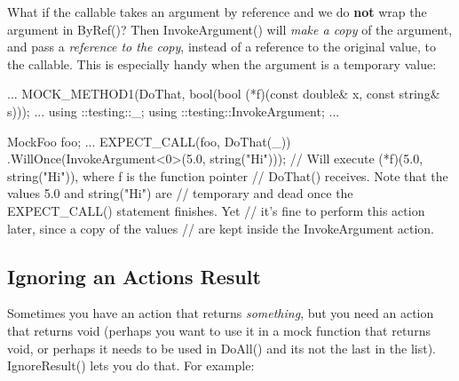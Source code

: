 What if the callable takes an argument by reference and we do {\bfseries not} wrap the argument in {\ttfamily By\+Ref()}? Then {\ttfamily Invoke\+Argument()} will {\itshape make a copy} of the argument, and pass a {\itshape reference to the copy}, instead of a reference to the original value, to the callable. This is especially handy when the argument is a temporary value\+:


\begin{DoxyCode}
...
  MOCK\_METHOD1(DoThat, \textcolor{keywordtype}{bool}(\textcolor{keywordtype}{bool} (*f)(\textcolor{keyword}{const} \textcolor{keywordtype}{double}& x, \textcolor{keyword}{const} \textcolor{keywordtype}{string}& s)));
...
using ::testing::\_;
using ::testing::InvokeArgument;
...

  MockFoo foo;
  ...
  EXPECT\_CALL(foo, DoThat(\_))
      .WillOnce(InvokeArgument<0>(5.0, \textcolor{keywordtype}{string}(\textcolor{stringliteral}{"Hi"})));
  \textcolor{comment}{// Will execute (*f)(5.0, string("Hi")), where f is the function pointer}
  \textcolor{comment}{// DoThat() receives.  Note that the values 5.0 and string("Hi") are}
  \textcolor{comment}{// temporary and dead once the EXPECT\_CALL() statement finishes.  Yet}
  \textcolor{comment}{// it's fine to perform this action later, since a copy of the values}
  \textcolor{comment}{// are kept inside the InvokeArgument action.}
\end{DoxyCode}


\subsection*{Ignoring an Action\textquotesingle{}s Result}

Sometimes you have an action that returns {\itshape something}, but you need an action that returns {\ttfamily void} (perhaps you want to use it in a mock function that returns {\ttfamily void}, or perhaps it needs to be used in {\ttfamily Do\+All()} and it\textquotesingle{}s not the last in the list). {\ttfamily Ignore\+Result()} lets you do that. For example\+:


